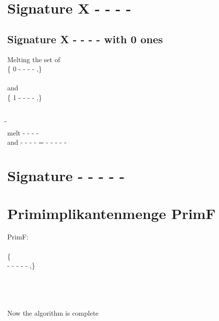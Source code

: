 \documentclass{article}
\begin{document}
\section{Signature X - - - - }
\subsection{Signature X - - - - with 0 ones}
Melting the set of\\
\{ 0  -  -  -  - ,\}\\\\
and\\
\{ 1  -  -  -  - ,\}\\\\
\begin{tabbing}
\hspace{3cm}\=\hspace{3cm}\=\hspace{3cm}\\[1cm]
melt  -  -  -  - \\
and  -  -  -  - \>
 =  -  -  -  -  - \\[1mm]
\end{tabbing}
\newpage
\section{Signature - - - - - }
\newpage
\section{Primimplikantenmenge PrimF}
PrimF:\\
\\
\{\\ -  -  -  -  - ,\}\\\\
\\
\\
\\
Now the algorithm is complete
\end{document}
